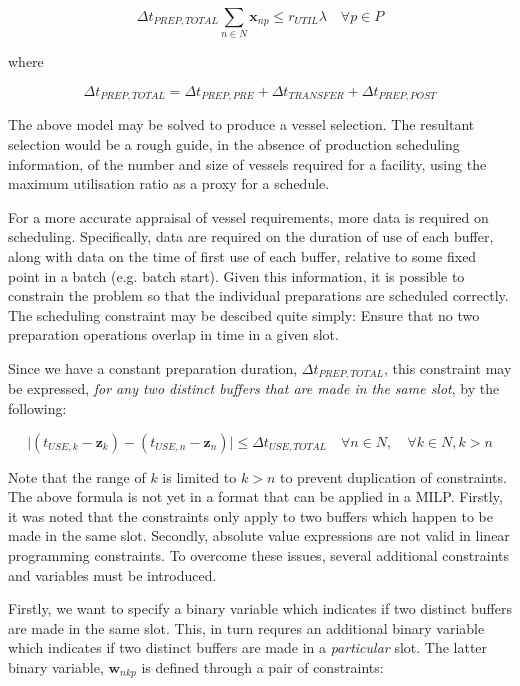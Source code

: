 \begin{equation}
    \Delta t_{PREP,TOTAL} \sum_{n \in N} \boldsymbol{x}_{np} \le r_{UTIL} 
    \lambda \quad \forall p \in P
\end{equation}

where

\begin{equation}
    \Delta t_{PREP,TOTAL} = \Delta t_{PREP,PRE} + \Delta t_{TRANSFER} +
    \Delta t_{PREP,POST}  
\end{equation}

The above model may be solved to produce a vessel selection.
The resultant selection would be a rough guide, in the absence of production
scheduling information, of the number and size of vessels required for a 
facility, using the maximum utilisation ratio as a proxy for a schedule.

For a more accurate appraisal of vessel requirements, more data is required
on scheduling.
Specifically, data are required on the duration of use of each buffer, along
with data on the time of first use of each buffer, relative to some fixed point
in a batch (e.g. batch start).
Given this information, it is possible to constrain the problem so that the
individual preparations are scheduled correctly.
The scheduling constraint may be descibed quite simply:
Ensure that no two preparation operations overlap in time in a given slot.

Since we have a constant preparation duration, $ \Delta t_{PREP,TOTAL} $, this
constraint may be expressed, \emph{for any two distinct buffers that are made
in the same slot}, by the following:

\begin{equation}
    \lvert \left( t_{USE,k} - \boldsymbol{z}_{k} \right) - \left( t_{USE,n} - 
    \boldsymbol{z}_{n} \right) \rvert \le \Delta t_{USE,TOTAL} \quad \forall n 
    \in N, \quad \forall k \in N, k > n
\end{equation}

Note that the range of $ k $ is limited to $ k > n $ to prevent duplication
of constraints.
The above formula is not yet in a format that can be applied in a MILP.
Firstly, it was noted that the constraints only apply to two buffers which
happen to be made in the same slot.
Secondly, absolute value expressions are not valid in linear programming
constraints.
To overcome these issues, several additional constraints and variables must be
introduced.

Firstly, we want to specify a binary variable which indicates if two distinct
buffers are made in the same slot.  
This, in turn requres an additional binary variable which indicates if two
distinct buffers are made in a \emph{particular} slot.
The latter binary variable, $ \boldsymbol{w}_{nkp} $ is defined through a pair
of constraints:

